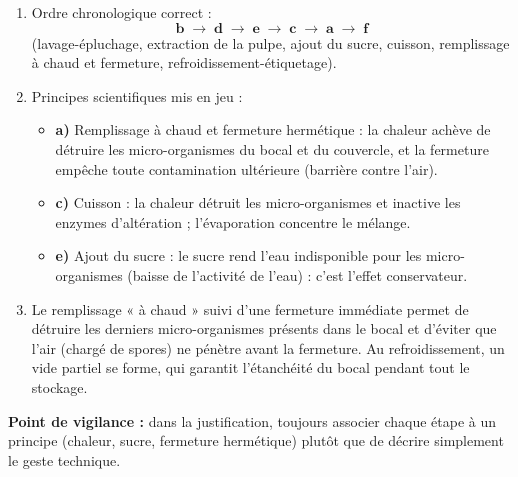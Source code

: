\documentclass[11pt]{article}
\begin{document}
\begin{corrige}
\begin{enumerate}
\item Ordre chronologique correct :
\[ \textbf{b} \;\rightarrow\; \textbf{d} \;\rightarrow\; \textbf{e} \;\rightarrow\; \textbf{c} \;\rightarrow\; \textbf{a} \;\rightarrow\; \textbf{f} \]
(lavage-épluchage, extraction de la pulpe, ajout du sucre, cuisson, remplissage à chaud et fermeture, refroidissement-étiquetage).
\item Principes scientifiques mis en jeu :
\begin{itemize}
\item \textbf{a)} Remplissage à chaud et fermeture hermétique : la chaleur achève de détruire les micro-organismes du bocal et du couvercle, et la fermeture empêche toute contamination ultérieure (barrière contre l'air).
\item \textbf{c)} Cuisson : la chaleur détruit les micro-organismes et inactive les enzymes d'altération ; l'évaporation concentre le mélange.
\item \textbf{e)} Ajout du sucre : le sucre rend l'eau indisponible pour les micro-organismes (baisse de l'activité de l'eau) : c'est l'effet conservateur.
\end{itemize}
\item Le remplissage « à chaud » suivi d'une fermeture immédiate permet de détruire les derniers micro-organismes présents dans le bocal et d'éviter que l'air (chargé de spores) ne pénètre avant la fermeture. Au refroidissement, un vide partiel se forme, qui garantit l'étanchéité du bocal pendant tout le stockage.
\end{enumerate}
\textbf{Point de vigilance :} dans la justification, toujours associer chaque étape à un principe (chaleur, sucre, fermeture hermétique) plutôt que de décrire simplement le geste technique.
\end{corrige}
\end{document}
